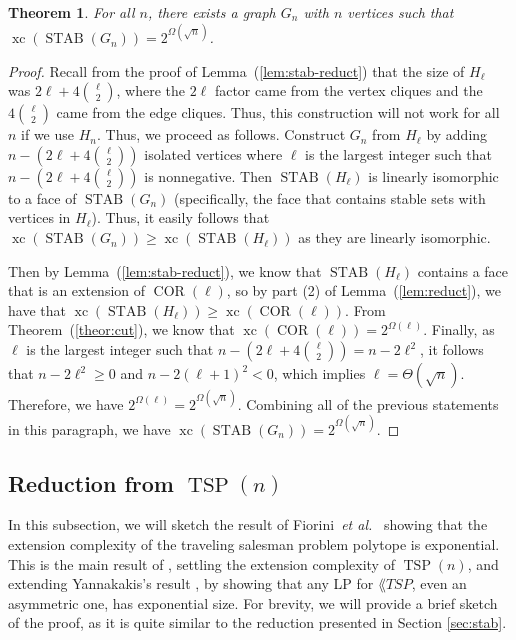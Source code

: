 \documentclass{article}
\makeatletter
\newtheorem{theorem}{\sc Theorem}
\theoremstyle{definition}
\theoremstyle{remark}
\newcommand{\cetal}{\textit{et al.\@}}  %
\newcommand{\xc}{\operatorname{xc}}
\newcommand{\TSP}{\operatorname{TSP}}
\newcommand{\STAB}{\operatorname{STAB}}
\newcommand{\COR}{\operatorname{COR}}
\makeatother
\begin{document}
\begin{theorem}\label{thm:stab-reduct}
For all $n$, there exists a graph $G_n$ with $n$ vertices such that $\xc(\STAB(G_n)) = 2^{\Omega(\sqrt{n})}$.
\end{theorem}
\begin{proof}
Recall from the proof of Lemma~(\ref{lem:stab-reduct}) that the size of $H_\ell$ was $2\ell + 4\binom{\ell}{2}$, where the $2\ell$ factor came from the vertex cliques and the $4\binom{\ell}{2}$ came from the edge cliques. Thus, this construction will not work for all $n$ if we use $H_n$. Thus, we proceed as follows. Construct $G_n$ from $H_\ell$ by adding $n - (2\ell + 4\binom{\ell}{2})$ isolated vertices where $\ell$ is the largest integer such that $n - (2\ell + 4\binom{\ell}{2})$ is nonnegative. Then $\STAB(H_\ell)$ is linearly isomorphic to a face of $\STAB(G_n)$ (specifically, the face that contains stable sets with vertices in $H_\ell$). Thus, it easily follows that $\xc(\STAB(G_n)) \ge \xc(\STAB(H_\ell))$ as they are linearly isomorphic.

Then by Lemma~(\ref{lem:stab-reduct}), we know that $\STAB(H_\ell)$ contains a face that is an extension of $\COR(\ell)$, so by part (2) of Lemma~(\ref{lem:reduct}), we have that $\xc(\STAB(H_\ell)) \ge \xc(\COR(\ell))$. From Theorem~(\ref{theor:cut}), we know that $\xc(\COR(\ell)) = 2^{\Omega(\ell)}$. Finally, as $\ell$ is the largest integer such that $n - (2\ell + 4\binom{\ell}{2}) = n - 2\ell^2$, it follows that $n - 2\ell^2 \ge 0$ and $n - 2(\ell + 1)^2 < 0$, which implies $\ell = \Theta(\sqrt{n})$. Therefore, we have $2^{\Omega(\ell)} = 2^{\Omega(\sqrt{n})}$. Combining all of the previous statements in this paragraph, we have $\xc(\STAB(G_n)) = 2^{\Omega(\sqrt{n})}$.
\end{proof}

\subsection{Reduction from $\TSP(n)$}

In this subsection, we will sketch the result of Fiorini~\cetal~\cite{fiorini} showing that the extension complexity of the traveling salesman problem polytope is exponential. This is the main result of \cite{fiorini}, settling the extension complexity of $\TSP(n)$, and extending Yannakakis's result \cite{yannakakis}, by showing that any LP for $\lang{TSP}$, even an asymmetric one, has exponential size. For brevity, we will provide a brief sketch of the proof, as it is quite similar to the reduction presented in Section \ref{sec:stab}.
\end{document}
